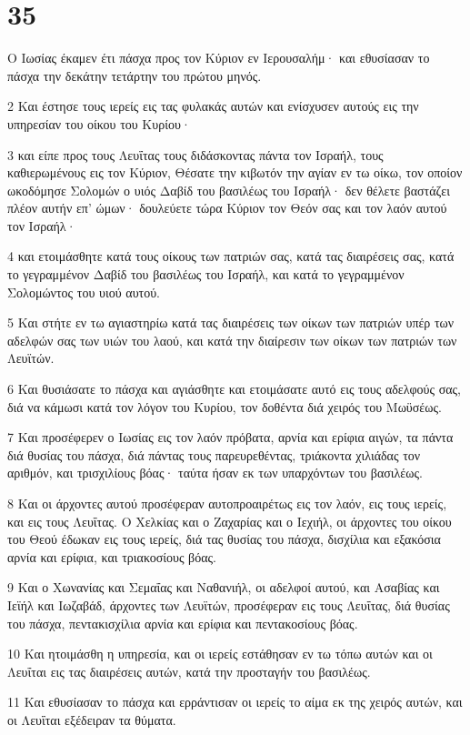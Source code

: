 \chapter{35}

\par Ο Ιωσίας έκαμεν έτι πάσχα προς τον Κύριον εν Ιερουσαλήμ· και εθυσίασαν το πάσχα την δεκάτην τετάρτην του πρώτου μηνός.
\par 2 Και έστησε τους ιερείς εις τας φυλακάς αυτών και ενίσχυσεν αυτούς εις την υπηρεσίαν του οίκου του Κυρίου·
\par 3 και είπε προς τους Λευΐτας τους διδάσκοντας πάντα τον Ισραήλ, τους καθιερωμένους εις τον Κύριον, Θέσατε την κιβωτόν την αγίαν εν τω οίκω, τον οποίον ωκοδόμησε Σολομών ο υιός Δαβίδ του βασιλέως του Ισραήλ· δεν θέλετε βαστάζει πλέον αυτήν επ' ώμων· δουλεύετε τώρα Κύριον τον Θεόν σας και τον λαόν αυτού τον Ισραήλ·
\par 4 και ετοιμάσθητε κατά τους οίκους των πατριών σας, κατά τας διαιρέσεις σας, κατά το γεγραμμένον Δαβίδ του βασιλέως του Ισραήλ, και κατά το γεγραμμένον Σολομώντος του υιού αυτού.
\par 5 Και στήτε εν τω αγιαστηρίω κατά τας διαιρέσεις των οίκων των πατριών υπέρ των αδελφών σας των υιών του λαού, και κατά την διαίρεσιν των οίκων των πατριών των Λευϊτών.
\par 6 Και θυσιάσατε το πάσχα και αγιάσθητε και ετοιμάσατε αυτό εις τους αδελφούς σας, διά να κάμωσι κατά τον λόγον του Κυρίου, τον δοθέντα διά χειρός του Μωϋσέως.
\par 7 Και προσέφερεν ο Ιωσίας εις τον λαόν πρόβατα, αρνία και ερίφια αιγών, τα πάντα διά θυσίας του πάσχα, διά πάντας τους παρευρεθέντας, τριάκοντα χιλιάδας τον αριθμόν, και τρισχιλίους βόας· ταύτα ήσαν εκ των υπαρχόντων του βασιλέως.
\par 8 Και οι άρχοντες αυτού προσέφεραν αυτοπροαιρέτως εις τον λαόν, εις τους ιερείς, και εις τους Λευΐτας. Ο Χελκίας και ο Ζαχαρίας και ο Ιεχιήλ, οι άρχοντες του οίκου του Θεού έδωκαν εις τους ιερείς, διά τας θυσίας του πάσχα, δισχίλια και εξακόσια αρνία και ερίφια, και τριακοσίους βόας.
\par 9 Και ο Χωνανίας και Σεμαΐας και Ναθανιήλ, οι αδελφοί αυτού, και Ασαβίας και Ιεϊήλ και Ιωζαβάδ, άρχοντες των Λευϊτών, προσέφεραν εις τους Λευΐτας, διά θυσίας του πάσχα, πεντακισχίλια αρνία και ερίφια και πεντακοσίους βόας.
\par 10 Και ητοιμάσθη η υπηρεσία, και οι ιερείς εστάθησαν εν τω τόπω αυτών και οι Λευΐται εις τας διαιρέσεις αυτών, κατά την προσταγήν του βασιλέως.
\par 11 Και εθυσίασαν το πάσχα και ερράντισαν οι ιερείς το αίμα εκ της χειρός αυτών, και οι Λευΐται εξέδειραν τα θύματα.
